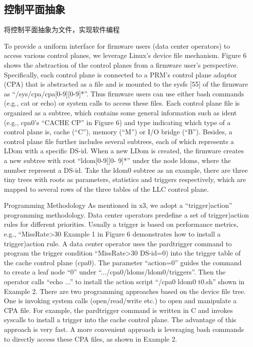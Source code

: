\subsection{控制平面抽象}

将控制平面抽象为文件，实现软件编程

To provide a uniform interface for firmware users (data center operators)
to access various control planes, we leverage Linux’s device
file mechanism. Figure 6 shows the abstraction of the control planes
from a firmware user’s perspective. Specifically, each control plane
is connected to a PRM’s control plane adaptor (CPA) that is abstracted
as a file and is mounted to the sysfs [55] of the firmware as
“/sys/cpa/cpa[0-9][0-9]*”. Thus firmware users can use either bash
commands (e.g., cat or echo) or system calls to access these files.
Each control plane file is organized as a subtree, which contains
some general information such as ident (e.g., cpa0’s “CACHE CP”
in Figure 6) and type indicating which type of a control plane
is, cache (“C”), memory (“M”) or I/O bridge (“B”). Besides, a
control plane file further includes several subtrees, each of which
represents a LDom with a specific DS-id. When a new LDom is
created, the firmware creates a new subtree with root “ldom[0-9][0-
9]*” under the node ldoms, where the number represent a DS-id.
Take the ldom0 subtree as an example, there are three tiny trees
with roots as parameters, statistics and triggers respectively, which
are mapped to several rows of the three tables of the LLC control
plane.

Programming Methodology
As mentioned in x3, we adopt a “trigger)action” programming
methodology. Data center operators predefine a set of trigger)action
rules for different priorities. Usually a trigger is based on performance
metrics, e.g., “MissRate>30%
Example 1 in Figure 6 demonstrates how to install a trigger)action
rule. A data center operator uses the pardtrigger command to program
the trigger condition “MissRate>30%
DS-id=0) into the trigger table of the cache control plane (cpa0).
The parameter “action=0” guides the command to create a leaf
node “0” under “.../cpa0/ldoms/ldom0/triggers”. Then the operator
calls “echo ...” to install the action script “/cpa0 ldom0 t0.sh”
shown in Example 2.
There are two programming approaches based on the device file
tree. One is invoking system calls (open/read/write etc.) to open
and manipulate a CPA file. For example, the pardtrigger command
is written in C and invokes syscalls to install a trigger into the
cache control plane. The advantage of this approach is very fast. A
more convenient approach is leveraging bash commands to directly
access these CPA files, as shown in Example 2.


